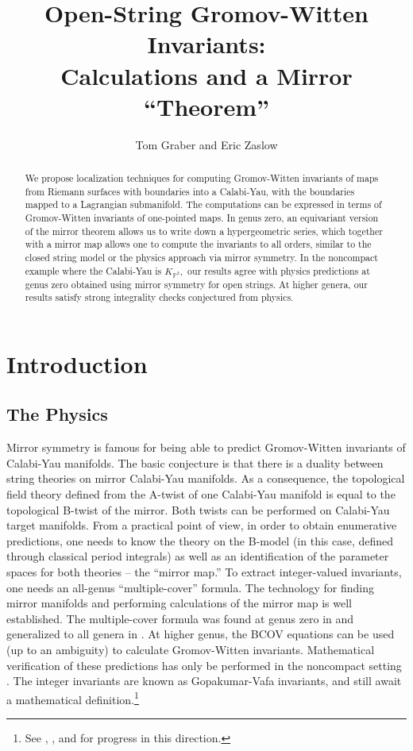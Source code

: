 \documentclass[a4paper,11pt]{article}
\newcommand{\PP}{{\mathbb{P}}}
\begin{document}
\title{Open-String Gromov-Witten Invariants:\\
Calculations and a Mirror ``Theorem''}
\author{Tom Graber and Eric Zaslow}
\maketitle

\begin{abstract}
We propose localization techniques
for computing Gromov-Witten invariants
of maps from Riemann surfaces with
boundaries into a Calabi-Yau,
with the boundaries mapped to a Lagrangian submanifold.
The computations can be expressed in terms of
Gromov-Witten invariants of one-pointed maps.
In genus zero,
an equivariant version of the mirror theorem
allows us to write down a hypergeometric
series, which together with a mirror map allows
one to compute the invariants to all orders,
similar to the closed string model or the physics
approach via mirror symmetry.
In the noncompact example where the
Calabi-Yau is $K_{\PP^2},$
our results agree with physics predictions
at genus zero obtained using
mirror symmetry for open strings.
At higher genera, our results satisfy strong
integrality checks conjectured from physics. 
\end{abstract}


\section{Introduction}

\subsection{The Physics}

Mirror symmetry is famous
for being able to predict Gromov-Witten
invariants of Calabi-Yau manifolds.  The basic
conjecture is that there is a duality
between string theories on mirror Calabi-Yau
manifolds.  As a consequence,
the topological field theory defined
from the A-twist of one Calabi-Yau manifold is equal
to the topological B-twist of the mirror.  Both twists
can be performed on Calabi-Yau target manifolds.
From a practical point of view, in order to obtain enumerative
predictions, one needs to know the theory on the B-model
(in this case, defined through classical period integrals)
as well as an identification of the parameter spaces
for both theories -- the ``mirror map.''  To extract
integer-valued invariants, one needs an all-genus
``multiple-cover'' formula.
The technology for finding mirror manifolds \cite{Batyrev} and
performing calculations of the mirror map \cite{HKTY}
is well established.  The multiple-cover formula was
found at genus zero in \cite{CDGP} and generalized to
all genera in \cite{GV}.  At higher genus, the BCOV equations
\cite{BCOV} can be used (up to an ambiguity) to calculate Gromov-Witten
invariants.  Mathematical verification of these predictions
has only be performed in the noncompact setting
\cite{Hosono1} \cite{KZ}.
The integer invariants
are known as Gopakumar-Vafa invariants, and still await
a mathematical definition.\footnote{See \cite{BP}, \cite{KKV},
and \cite{Hosono2} for progress in this direction.}
\end{document}
